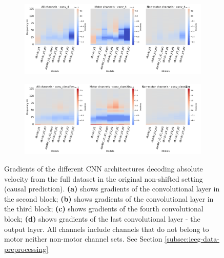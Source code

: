 \begin{figure}[!htbp]\ContinuedFloat

\begin{subfigure}[c]{\textwidth}
   \includegraphics[width=0.9\linewidth]{img/appendix/A/conv-4/m/absVel-model-gradients_all_kinds}
   \caption{}
   \label{fig:absVel-full-grads-conv-4}
\end{subfigure}

\begin{subfigure}[d]{\textwidth}
   \includegraphics[width=0.9\linewidth]{img/appendix/A/conv-classifier/m/absVel-model-gradients_all_kinds}
   \caption{}
   \label{fig:absVel-full-grads-conv-classifier}
\end{subfigure}

\caption[]{Gradients of the different CNN architectures decoding absolute velocity from the full dataset in the original non-shifted setting (causal prediction). \textbf{(a)} shows gradients of the convolutional layer in the second block; \textbf{(b)} shows gradients of the convolutional layer in the third block; \textbf{(c)} shows gradients of the fourth convolutional block; \textbf{(d)} shows gradients of the last convolutional layer - the output layer. All channels include channels that do not belong to motor neither non-motor channel sets. See Section \ref{subsec:ieeg-data-preprocessing}}
\label{fig:absVel-full-grads}
\end{figure}

\clearpage

